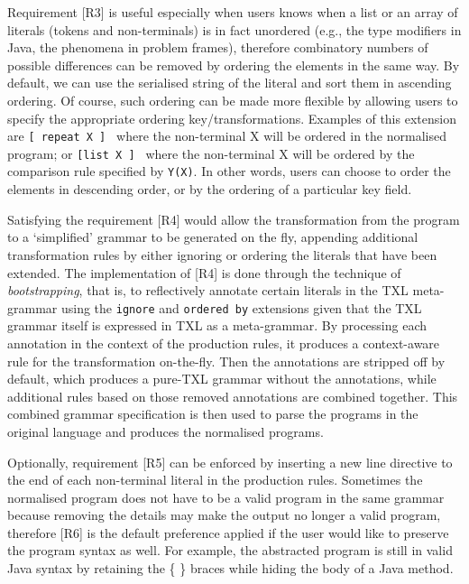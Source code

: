 \documentclass{acm_proc_article-sp}
\begin{document}
Requirement [R3] is useful especially when users knows when a list or an array of literals (tokens and non-terminals) is in fact unordered (e.g., the type modifiers in Java, the phenomena in problem frames), therefore combinatory numbers of possible differences can be removed by ordering the elements in the same way. By default, we can use the serialised string of the literal and sort them in ascending ordering. Of course, such ordering can be made more flexible by allowing users to specify the appropriate ordering key/transformations. Examples of this extension are {\tt [ repeat X  ] } where the non-terminal X will be ordered in the normalised program; or {\tt [list X ] } where the non-terminal X will be ordered by the comparison rule specified by {\tt Y(X)}. In other words, users can choose to order the elements in descending order, or by the ordering of a particular key field. 

Satisfying the requirement [R4] would allow the transformation from the program to a `simplified' grammar to be generated on the fly, appending additional transformation rules by either ignoring or ordering the literals that have been extended.  The implementation of [R4] is done through the technique of {\em bootstrapping}, that is, to reflectively annotate certain literals in the TXL meta-grammar using the {\tt ignore} and {\tt ordered by} extensions given that the TXL grammar itself is expressed in TXL as a meta-grammar. By processing each annotation in the context of the production rules, it produces a context-aware rule for the transformation on-the-fly. Then the annotations are stripped off by default, which produces a pure-TXL grammar without the annotations, while additional rules based on those removed annotations are combined together. This combined grammar specification is then used to parse the programs in the original language and produces the normalised programs. 

Optionally, requirement [R5] can be  enforced by inserting a new line directive  {\tt \underbar {[NL]}} to the end of each non-terminal literal in the production rules. Sometimes the normalised program does not have to be a valid program in the same grammar because removing the details may make the output no longer a valid program, therefore [R6] is the default preference applied if the user would like to preserve the program syntax as well. For example, the abstracted program is still in valid Java syntax by retaining the \{ \} braces while hiding the body of a Java method.
\end{document}
